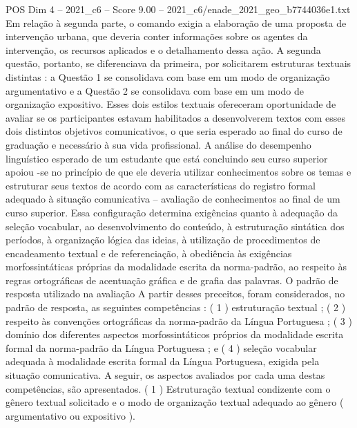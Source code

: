\begin{textsample}{POS Dim 4 – 2021\_c6 – Score 9.00 – 2021\_c6/enade\_2021\_geo\_b7744036e1.txt}
Em relação à segunda parte, o comando exigia a elaboração de uma proposta de intervenção urbana, que deveria conter informações sobre os agentes da intervenção, os recursos aplicados e o detalhamento dessa ação.
A segunda questão, portanto, se diferenciava da primeira, por solicitarem estruturas textuais distintas : a Questão 1 se consolidava com base em um modo de organização argumentativo e a Questão 2 se consolidava com base em um modo de organização expositivo.
Esses dois estilos textuais ofereceram oportunidade de avaliar se os participantes estavam habilitados a desenvolverem textos com esses dois distintos objetivos comunicativos, o que seria esperado ao final do curso de graduação e necessário à sua vida profissional.
A análise do desempenho linguístico esperado de um estudante que está concluindo seu curso superior apoiou -se no princípio de que ele deveria utilizar conhecimentos sobre os temas e estruturar seus textos de acordo com as características do registro formal adequado à situação comunicativa – avaliação de conhecimentos ao final de um curso superior.
Essa configuração determina exigências quanto à adequação da seleção vocabular, ao desenvolvimento do conteúdo, à estruturação sintática dos períodos, à organização lógica das ideias, à utilização de procedimentos de encadeamento textual e de referenciação, à obediência às exigências morfossintáticas próprias da modalidade escrita da norma-padrão, ao respeito às regras ortográficas de acentuação gráfica e de grafia das palavras.
O padrão de resposta utilizado na avaliação A partir desses preceitos, foram considerados, no padrão de resposta, as seguintes competências : ( 1 ) estruturação textual ; ( 2 ) respeito às convenções ortográficas da norma-padrão da Língua Portuguesa ; ( 3 ) domínio dos diferentes aspectos morfossintáticos próprios da modalidade escrita formal da norma-padrão da Língua Portuguesa ; e ( 4 ) seleção vocabular adequada à modalidade escrita formal da Língua Portuguesa, exigida pela situação comunicativa.
A seguir, os aspectos avaliados por cada uma destas competências, são apresentados. ( 1 ) Estruturação textual condizente com o gênero textual solicitado e o modo de organização textual adequado ao gênero ( argumentativo ou expositivo ).

\end{textsample}

